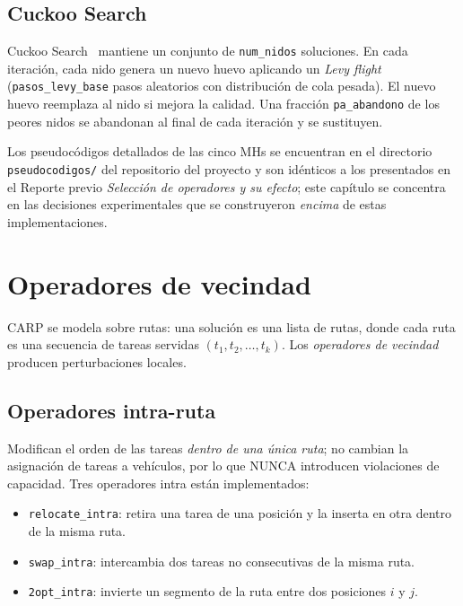 \documentclass[11pt,a4paper]{article}
\theoremstyle{definition}
\theoremstyle{remark}
\begin{document}
\subsection{Cuckoo Search}

Cuckoo Search~\cite{yang2009} mantiene un conjunto de \texttt{num\_nidos} soluciones.
En cada iteración, cada nido genera un nuevo huevo aplicando un
\emph{Levy flight} (\texttt{pasos\_levy\_base} pasos aleatorios con
distribución de cola pesada). El nuevo huevo reemplaza al nido si
mejora la calidad. Una fracción \texttt{pa\_abandono} de los peores
nidos se abandonan al final de cada iteración y se sustituyen.

Los pseudocódigos detallados de las cinco MHs se encuentran en el
directorio \texttt{pseudocodigos/} del repositorio del proyecto y son
idénticos a los presentados en el Reporte previo
\emph{Selección de operadores y su efecto}; este capítulo se concentra
en las decisiones experimentales que se construyeron \emph{encima} de
estas implementaciones.

\section{Operadores de vecindad}
\label{sec:operadores}

CARP se modela sobre rutas: una solución es una lista de rutas, donde
cada ruta es una secuencia de tareas servidas $(t_1, t_2, \dots, t_k)$.
Los \emph{operadores de vecindad} producen perturbaciones locales.

\subsection{Operadores intra-ruta}

Modifican el orden de las tareas \emph{dentro de una única ruta}; no
cambian la asignación de tareas a vehículos, por lo que NUNCA introducen
violaciones de capacidad. Tres operadores intra están implementados:

\begin{itemize}
\item \texttt{relocate\_intra}: retira una tarea de una posición y la
  inserta en otra dentro de la misma ruta.
\item \texttt{swap\_intra}: intercambia dos tareas no consecutivas de
  la misma ruta.
\item \texttt{2opt\_intra}: invierte un segmento de la ruta entre dos
  posiciones $i$ y $j$.
\end{itemize}
\end{document}

